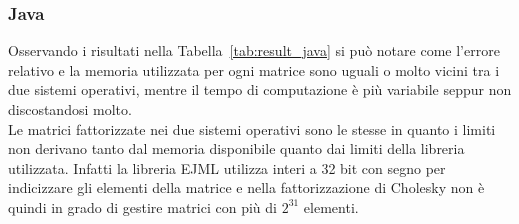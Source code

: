 \documentclass[a4paper, 12pt]{article}
\begin{document}
\subsubsection{Java}
Osservando i risultati nella Tabella~\ref{tab:result_java} si può notare come
l'errore relativo e la memoria utilizzata per ogni matrice sono uguali o molto
vicini tra i due sistemi operativi, mentre il tempo di computazione è più
variabile seppur non discostandosi molto.\\
Le matrici fattorizzate nei due sistemi operativi sono le stesse in quanto i
limiti non derivano tanto dal memoria disponibile quanto dai limiti della
libreria utilizzata. Infatti la libreria EJML utilizza interi a 32 bit con segno
per indicizzare gli elementi della matrice e nella fattorizzazione di Cholesky
non è quindi in grado di gestire matrici con più di $2^{31}$ elementi.
\begin{table}[ht]
\centering
{}
\caption{Risultati dei benchmark Java}
\label{tab:result_java}
\end{table}
\end{document}
